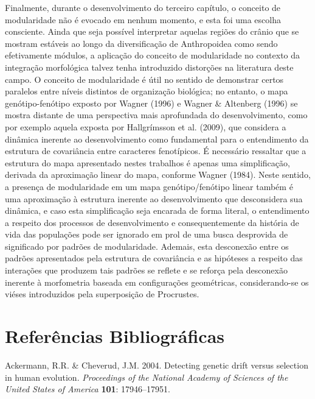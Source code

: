 \documentclass[12pt,twoside]{report}
\begin{document}
Finalmente, durante o desenvolvimento do terceiro capítulo, o conceito
de modularidade não é evocado em nenhum momento, e esta foi uma escolha
consciente. Ainda que seja possível interpretar aquelas regiões do
crânio que se mostram estáveis ao longo da diversificação de
Anthropoidea como sendo efetivamente módulos, a aplicação do conceito de
modularidade no contexto da integração morfológica talvez tenha
introduzido distorções na literatura deste campo. O conceito de
modularidade é útil no sentido de demonstrar certos paralelos entre
níveis distintos de organização biológica; no entanto, o mapa
genótipo-fenótipo exposto por Wagner (1996) e Wagner \& Altenberg (1996)
se mostra distante de uma perspectiva mais aprofundada do
desenvolvimento, como por exemplo aquela exposta por Hallgrímsson et al.
(2009), que considera a dinâmica inerente ao desenvolvimento como
fundamental para o entendimento da estrutura de covariância entre
caracteres fenotípicos. É necessário ressaltar que a estrutura do mapa
apresentado nestes trabalhos é apenas uma simplificação, derivada da
aproximação linear do mapa, conforme Wagner (1984). Neste sentido, a
presença de modularidade em um mapa genótipo/fenótipo linear também é
uma aproximação à estrutura inerente ao desenvolvimento que desconsidera
sua dinâmica, e caso esta simplificação seja encarada de forma literal,
o entendimento a respeito dos processos de desenvolvimento e
consequentemente da história de vida das populações pode ser ignorado em
prol de uma busca desprovida de significado por padrões de modularidade.
Ademais, esta desconexão entre os padrões apresentados pela estrutura de
covariância e as hipóteses a respeito das interações que produzem tais
padrões se reflete e se reforça pela desconexão inerente à morfometria
baseada em configurações geométricas, considerando-se os viéses
introduzidos pela superposição de Procrustes.

\newpage

\pagestyle{plain}

\chapter*{Referências Bibliográficas}


Ackermann, R.R. \& Cheverud, J.M. 2004. Detecting genetic drift versus
selection in human evolution. \emph{Proceedings of the National Academy
of Sciences of the United States of America} \textbf{101}: 17946--17951.
\end{document}
